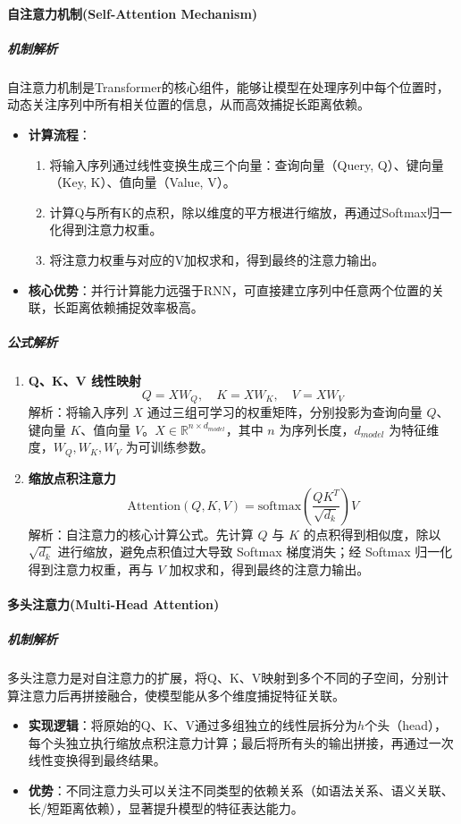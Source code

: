 \documentclass[12pt]{article}
\begin{document}
\paragraph{自注意力机制(Self-Attention Mechanism)}
\subparagraph{机制解析}
自注意力机制是Transformer的核心组件，能够让模型在处理序列中每个位置时，动态关注序列中所有相关位置的信息，从而高效捕捉长距离依赖。
\begin{itemize}
    \item \textbf{计算流程}：
    \begin{enumerate}
        \item 将输入序列通过线性变换生成三个向量：查询向量（Query, Q）、键向量（Key, K）、值向量（Value, V）。
        \item 计算Q与所有K的点积，除以维度的平方根进行缩放，再通过Softmax归一化得到注意力权重。
        \item 将注意力权重与对应的V加权求和，得到最终的注意力输出。
    \end{enumerate}
    \item \textbf{核心优势}：并行计算能力远强于RNN，可直接建立序列中任意两个位置的关联，长距离依赖捕捉效率极高。
\end{itemize}

\subparagraph{公式解析}
\begin{enumerate}
    \item \textbf{Q、K、V 线性映射}
    \[
    Q = X W_Q,\quad K = X W_K,\quad V = X W_V
    \]
    解析：将输入序列 $X$ 通过三组可学习的权重矩阵，分别投影为查询向量 $Q$、键向量 $K$、值向量 $V$。$X\in\mathbb{R}^{n\times d_{model}}$，其中 $n$ 为序列长度，$d_{model}$ 为特征维度，$W_Q,W_K,W_V$ 为可训练参数。

    \item \textbf{缩放点积注意力}
    \[
    \text{Attention}(Q,K,V) = \text{softmax}\left( \frac{Q K^T}{\sqrt{d_k}} \right) V
    \]
    解析：自注意力的核心计算公式。先计算 $Q$ 与 $K$ 的点积得到相似度，除以 $\sqrt{d_k}$ 进行缩放，避免点积值过大导致 Softmax 梯度消失；经 Softmax 归一化得到注意力权重，再与 $V$ 加权求和，得到最终的注意力输出。
\end{enumerate}

\paragraph{多头注意力(Multi-Head Attention)}
\subparagraph{机制解析}
多头注意力是对自注意力的扩展，将Q、K、V映射到多个不同的子空间，分别计算注意力后再拼接融合，使模型能从多个维度捕捉特征关联。
\begin{itemize}
    \item \textbf{实现逻辑}：将原始的Q、K、V通过多组独立的线性层拆分为$h$个头（head），每个头独立执行缩放点积注意力计算；最后将所有头的输出拼接，再通过一次线性变换得到最终结果。
    \item \textbf{优势}：不同注意力头可以关注不同类型的依赖关系（如语法关系、语义关联、长/短距离依赖），显著提升模型的特征表达能力。
\end{itemize}
\end{document}
